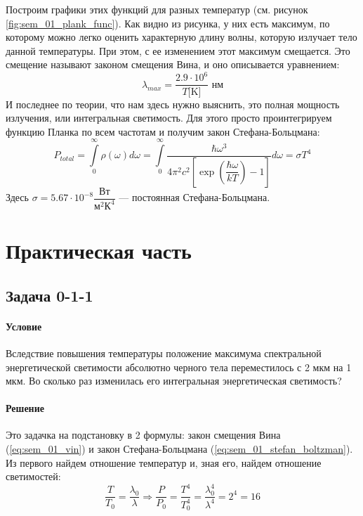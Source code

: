 \documentclass[12pt]{article}
\begin{document}
Построим графики этих функций для разных температур (см. рисунок \ref{fig:sem_01_plank_func}). Как видно из рисунка, у них есть максимум, по которому можно легко оценить характерную длину волны, которую излучает тело данной температуры. При этом, с ее изменением этот максимум смещается. Это смещение называют законом смещения Вина, и оно описывается уравнением:
\begin{equation}
\label{eq:sem_01_vin}
    \lambda_{max} = \dfrac{2.9 \cdot 10^6}{T \text{[K]}} \text{ нм}
\end{equation}
И последнее по теории, что нам здесь нужно выяснить, это полная мощность излучения, или интегральная светимость. Для этого просто проинтегрируем функцию Планка по всем частотам и получим закон Стефана-Больцмана:
\begin{equation}
\label{eq:sem_01_stefan_boltzman}
    P_{total} =\int\limits_{0}^{\infty}\rho(\omega)d\omega = \int\limits_{0}^{\infty}\dfrac{\hbar \omega^3}{4\pi^2c^2\left[ \exp{\left(\dfrac{\hbar \omega}{kT}\right)} - 1\right]}d\omega = \sigma T^4
\end{equation}
Здесь $\sigma = 5.67 \cdot 10^{-8} \dfrac{\text{Вт}}{\text{м}^2 \text{К}^4}$ --- постоянная Стефана-Больцмана.

\section{Практическая часть}

\subsection{Задача 0-1-1}
\label{task_011}
\paragraph{Условие}
Вследствие повышения температуры положение максимума спектральной энергетической светимости абсолютно черного тела переместилось с 2 мкм на 1 мкм. Во сколько раз изменилась его интегральная энергетическая светимость?
\paragraph{Решение}
Это задачка на подстановку в 2 формулы: закон смещения Вина (\ref{eq:sem_01_vin}) и закон Стефана-Больцмана (\ref{eq:sem_01_stefan_boltzman}). Из первого найдем отношение температур и, зная его, найдем отношение светимостей: 
\begin{equation*}
    \dfrac{T}{T_0} = \dfrac{\lambda_0}{\lambda} \Rightarrow \dfrac{P}{P_0} = \dfrac{T^4}{T^4_0} = \dfrac{\lambda^4_0}{\lambda^4} = 2^4 =16 
\end{equation*}
\end{document}

